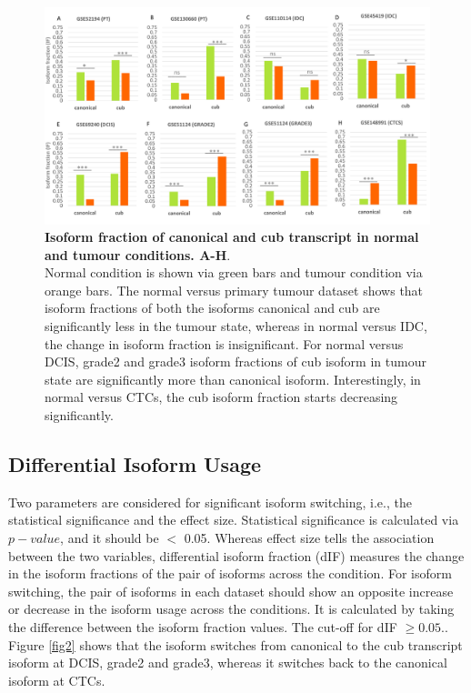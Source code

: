\documentclass[fleqn,10pt,lineno]{wlpeerj}
\begin{document}
\begin{figure}[ht] %
\centering
\captionsetup{justification=centering}
\vspace{.5cm} %
\begin{flushleft}
\includegraphics[width=150mm]{Figure1.pdf}
\caption{\textbf{Isoform fraction of canonical and cub transcript in normal and tumour conditions. A-H}.\\ 
Normal condition is shown via green bars and tumour condition via orange bars. The normal versus primary tumour dataset shows that isoform fractions of both the isoforms canonical and cub are significantly less in the tumour state, whereas in normal versus IDC, the change in isoform fraction is insignificant. For normal versus DCIS, grade2 and grade3 isoform fractions of cub isoform in tumour state are significantly more than canonical isoform. Interestingly, in normal versus CTCs, the cub isoform fraction starts decreasing significantly.
} 
\label{fig1}
\end{flushleft}
\end{figure}

\subsection*{Differential Isoform Usage}
Two parameters are considered for significant isoform switching, i.e., the statistical significance and the effect size. Statistical significance is calculated via  $p-value$, and it should be $<$ 0.05. Whereas effect size tells the association between the two variables, differential isoform fraction (dIF) measures the change in the isoform fractions of the pair of isoforms across the condition. For isoform switching, the pair of isoforms in each dataset should show an opposite increase or decrease in the isoform usage across the conditions. It is calculated by taking the difference between the isoform fraction values. The cut-off for dIF $ \ge 0.05.$. Figure \ref{fig2} shows that the isoform switches from canonical to the cub transcript isoform at DCIS, grade2 and grade3, whereas it switches back to the canonical isoform at CTCs.
\end{document}
